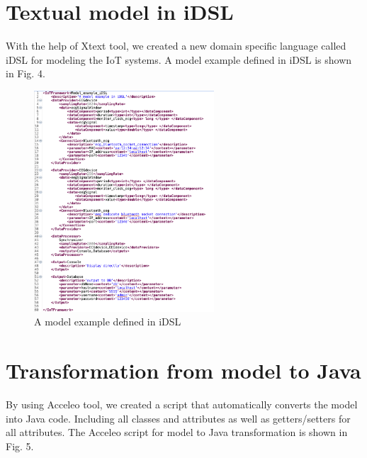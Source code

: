 \documentclass[11pt, oneside]{article}   	%
\begin{document}
\clearpage 
\begin{appendices}

\section{Textual model in iDSL}
\indent \par With the help of Xtext tool, we created a new domain specific language called iDSL for modeling the IoT systems. A model example defined in iDSL is shown in Fig. 4. 
\begin{figure}[htbp] 
\centering 
\includegraphics[width=0.6\textwidth]{Xtext-model.png} 
\caption{A model example defined in iDSL} 
\label{Fig.main4} 
\end{figure}

\clearpage
\section{Transformation from model to Java}
\indent \par By using Acceleo tool, we created a script that automatically converts the model into Java code. Including all classes and attributes as well as getters/setters for all attributes. The Acceleo script for model to Java transformation is shown in Fig. 5.


\end{appendices}
\end{document}
